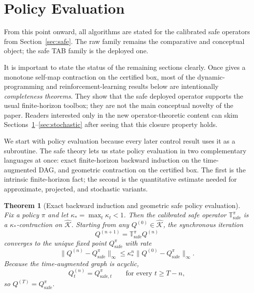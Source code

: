 \documentclass{article}
\newtheorem{theorem}{Theorem}[section]
\theoremstyle{remark}
\newcommand{\safe}{\mathrm{safe}}
\newcommand{\Ksafe}{\widehat{\mathcal K}}
\begin{document}
\section{Policy Evaluation}
\label{sec:policy-eval}

From this point onward, all algorithms are stated for the calibrated safe operators from Section~\ref{sec:safe}. The raw family remains the comparative and conceptual object; the safe TAB family is the deployed one.

It is important to state the status of the remaining sections clearly. Once  gives a monotone self-map contraction on the certified box, most of the dynamic-programming and reinforcement-learning results below are intentionally \emph{completeness theorems}. They show that the safe deployed operator supports the usual finite-horizon toolbox; they are not the main conceptual novelty of the paper. Readers interested only in the new operator-theoretic content can skim Sections~\ref{sec:policy-eval}--\ref{sec:stochastic} after seeing that this closure property holds.

We start with policy evaluation because every later control result uses it as a subroutine. The safe theory lets us state policy evaluation in two complementary languages at once: exact finite-horizon backward induction on the time-augmented DAG, and geometric contraction on the certified box. The first is the intrinsic finite-horizon fact; the second is the quantitative estimate needed for approximate, projected, and stochastic variants.

\begin{theorem}[Exact backward induction and geometric safe policy evaluation]
\label{thm:policy-eval}
Fix a policy $\pi$ and let $\kappa_* = \max_t \kappa_t <1$.
Then the calibrated safe operator $\mathbb T_\safe^\pi$ is a $\kappa_*$-contraction on $\Ksafe$.
Starting from any $Q^{(0)}\in\Ksafe$, the synchronous iteration
\begin{equation}
Q^{(n+1)} = \mathbb T_\safe^\pi Q^{(n)}
\label{eq:safe-policy-eval-iter}
\end{equation}
converges to the unique fixed point $Q_\safe^\pi$ with rate
\begin{equation}
\|Q^{(n)}-Q_\safe^\pi\|_\infty
\le
\kappa_*^n\|Q^{(0)}-Q_\safe^\pi\|_\infty.
\label{eq:safe-policy-eval-rate}
\end{equation}
Because the time-augmented graph is acyclic,
\begin{equation}
Q_t^{(n)} = Q_{\safe,t}^\pi
\qquad\text{for every } t\ge T-n,
\label{eq:safe-tail-exact}
\end{equation}
so $Q^{(T)}=Q_\safe^\pi$.
\end{theorem}
\end{document}
